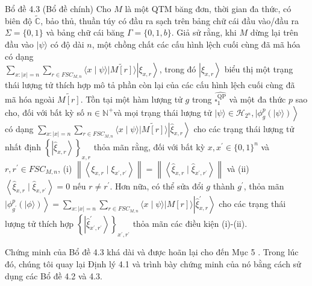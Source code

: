 \documentclass[10pt]{article}
\begin{document}
Bổ đề 4.3 (Bổ đề chính) Cho $M$ là một QTM băng đơn, thời gian đa thức, có biên độ $\tilde{\mathbb{C}}$, bảo thủ, thuần túy có đầu ra sạch trên bảng chữ cái đầu vào/đầu ra $\Sigma=\{0,1\}$ và bảng chữ cái băng $\Gamma=\{0,1, b\}$. Giả sử rằng, khi $M$ dừng lại trên đầu vào $|\psi\rangle$ có độ dài $n$, một chồng chất các cấu hình lệch cuối cùng đã mã hóa có dạng\\
$\sum_{x:|x|=n} \sum_{r \in F S C_{M, n}}\langle x \mid \psi\rangle|\widetilde{M[r]}\rangle\left|\xi_{x, r}\right\rangle$, trong đó $\left|\xi_{x, r}\right\rangle$ biểu thị một trạng thái lượng tử thích hợp mô tả phần còn lại của các cấu hình lệch cuối cùng đã mã hóa ngoài $\widetilde{M[r]}$. Tồn tại một hàm lượng tử $g$ trong $\widehat{\square_{1}^{\mathrm{QP}}}$ và một đa thức $p$ sao cho, đối với bất kỳ số $n \in \mathbb{N}^{+}$và mọi trạng thái lượng tử $\left.|\psi\rangle \in \mathcal{H}_{2^{n}}, \mid \phi_{g}^{p}(|\psi\rangle)\right\rangle$ có dạng $\sum_{x:|x|=n} \sum_{r \in F S C_{M, n}}\langle x \mid \psi\rangle|\widetilde{M[r]}\rangle\left|\widehat{\xi}_{x, r}\right\rangle$ cho các trạng thái lượng tử nhất định $\left\{\left|\widehat{\xi}_{x, r}\right\rangle\right\}_{x, r}$ thỏa mãn rằng, đối với bất kỳ $x, x^{\prime} \in\{0,1\}^{n}$ và $r, r^{\prime} \in F S C_{M, n}$, (i) $\left\|\left\langle\xi_{x, r} \mid \xi_{x^{\prime}, r^{\prime}}\right\rangle\right\|=\left\|\left\langle\widehat{\xi}_{x, r} \mid \widehat{\xi}_{x^{\prime}, r^{\prime}}\right\rangle\right\|$ và (ii) $\left\langle\widehat{\xi}_{x, r} \mid \widehat{\xi}_{x, r^{\prime}}\right\rangle=0$ nếu $r \neq r^{\prime}$. Hơn nữa, có thể sửa đổi $g$ thành $g^{\prime}$, thỏa mãn $\left.\mid \phi_{g^{\prime}}^{p}(|\phi\rangle)\right\rangle=\sum_{x:|x|=n} \sum_{r \in F S C_{M, n}}\langle x \mid \psi\rangle|M[r]\rangle\left|\widehat{\xi}_{x, r}^{\prime}\right\rangle$ cho các trạng thái lượng tử thích hợp $\left\{\left|\widehat{\xi}_{x^{\prime}, r^{\prime}}^{\prime}\right\rangle\right\}_{x^{\prime}, r^{\prime}}$ thỏa mãn các điều kiện (i)-(ii).

Chứng minh của Bổ đề 4.3 khá dài và được hoãn lại cho đến Mục 5 . Trong lúc đó, chúng tôi quay lại Định lý 4.1 và trình bày chứng minh của nó bằng cách sử dụng các Bổ đề 4.2 và 4.3.
\end{document}

